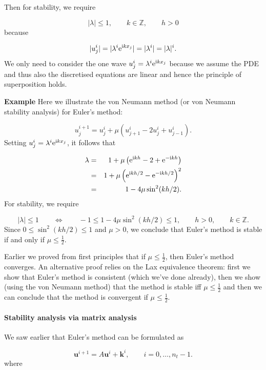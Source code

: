 \documentclass[12pt,landscape]{article}
\begin{document}
{Then for stability, we require

\[
\vert \lambda \vert \leq 1, \qquad  k \in \mathbb{Z}, \qquad h > 0
\]
because

\[
\vert u^i_j \vert = \vert \lambda^i {\rm e}^{{\rm i}k x_j} \vert = \vert \lambda^i \vert = \vert \lambda \vert^i.
\]
We only need to consider the one wave $u^i_j = \lambda^i {\rm e}^{{\rm i}k x_j}$ because we assume the PDE and thus also the discretised equations are linear and hence the principle of superposition holds. 

\textbf{Example} Here we illustrate the von Neumann method (or von Neumann stability analysis) for Euler's method:

\[
u^{i+1}_j = u^i_j + \mu \left( u^{i}_{j+1} - 2u^i_j + u^i_{j-1}  \right).
\]
Setting $u^i_j = \lambda^i {\rm e}^{{\rm i}k x_j}$, it follows that


\begin{eqnarray*}
\lambda &=& 1 + \mu\left({\rm e}^{{\rm i}kh} - 2 +  {\rm e}^{-{\rm i}kh}  \right)  \\
&=& 1 + \mu\left({\rm e}^{{\rm i}kh/2}  -  {\rm e}^{-{\rm i}kh/2}  \right)^2  \\
&=& 1 - 4\mu \sin^2(kh/2).
\end{eqnarray*}
For stability, we require

\[
\vert \lambda \vert \leq 1 \qquad \Leftrightarrow \qquad  -1 \leq  1 - 4\mu \sin^2(kh/2) \leq 1, \qquad h>0, \qquad k \in \mathbb{Z}.
\]
Since $0 \leq \sin^2(kh/2) \leq 1$ and $\mu > 0$, we conclude that Euler's method is stable if and only if $\mu \leq \frac{1}{2}$.

Earlier we proved from first principles that if $\mu \leq \frac{1}{2}$, then Euler's method converges. An alternative proof relies on the Lax equivalence theorem: first we show that Euler's method is consistent (which we've done already), then we show (using the von Neumann method) that the method is stable iff $\mu \leq \frac{1}{2}$ and then we can conclude that the method is convergent if $\mu \leq \frac{1}{2}$.

\paragraph{Stability analysis via matrix analysis}
We saw earlier that Euler's method can be formulated as

\[
\mathbf{u}^{i+1} = A\mathbf{u}^i + \mathbf{k}^i, \qquad i = 0, \ldots, n_t-1.
\]
where

}
\end{document}
